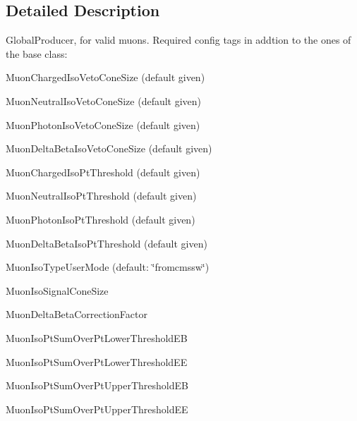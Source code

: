 \subsection{Detailed Description}
GlobalProducer, for valid muons. Required config tags in addtion to the ones of the base class:
\begin{DoxyItemize}
\item MuonChargedIsoVetoConeSize (default given)
\item MuonNeutralIsoVetoConeSize (default given)
\item MuonPhotonIsoVetoConeSize (default given)
\item MuonDeltaBetaIsoVetoConeSize (default given)
\item MuonChargedIsoPtThreshold (default given)
\item MuonNeutralIsoPtThreshold (default given)
\item MuonPhotonIsoPtThreshold (default given)
\item MuonDeltaBetaIsoPtThreshold (default given)
\item MuonIsoTypeUserMode (default: \char`\"{}fromcmssw\char`\"{})
\item MuonIsoSignalConeSize
\item MuonDeltaBetaCorrectionFactor
\item MuonIsoPtSumOverPtLowerThresholdEB
\item MuonIsoPtSumOverPtLowerThresholdEE
\item MuonIsoPtSumOverPtUpperThresholdEB
\item MuonIsoPtSumOverPtUpperThresholdEE 
\end{DoxyItemize}

